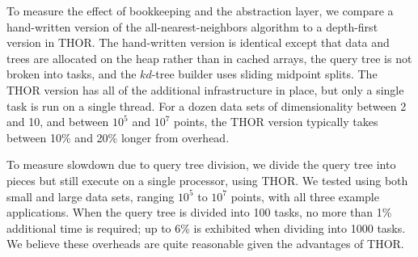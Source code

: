 \documentclass[twoside,leqno,twocolumn]{article}
\newcommand{\authornote}[1]{(\footnote{Note to self: #1})}
\newcommand{\authorsnote}[1]{\authornote{#1}}
\newcommand{\fig}[1]{Figure~\ref{fig:#1}}
\begin{document}
To measure the effect of bookkeeping and the abstraction layer, we compare a hand-written version of the all-nearest-neighbors algorithm to a depth-first version in THOR.
The hand-written version is identical except that data and trees are allocated on the heap rather than in cached arrays, the query tree is not broken into tasks, and the $kd$-tree builder uses sliding midpoint splits.
The THOR version has all of the additional infrastructure in place, but only a single task is run on a single thread.
For a dozen data sets of dimensionality between 2 and 10, and between $10^5$ and $10^7$ points, the THOR version typically takes between 10\% and 20\% longer from overhead.

To measure slowdown due to query tree division, we divide the query tree into pieces but still execute on a single processor, using THOR.
We tested using both small and large data sets, ranging $10^5$ to $10^7$ points, with all three example applications.
When the query tree is divided into 100 tasks, no more than 1\% additional time is required; up to 6\% is exhibited when dividing into 1000 tasks.
We believe these overheads are quite reasonable given the advantages of THOR.


\end{document}

